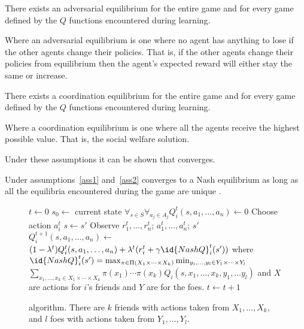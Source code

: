 \begin{assumption}
  \label{ass1}
  There exists an adversarial equilibrium for the entire game and
  for every game defined by the $Q$ functions encountered during
  learning.
\end{assumption}
Where an adversarial equilibrium is one where no agent has anything to
lose if the other agents change their policies. That is, if the other
agents change their policies from equilibrium then the agent's
expected reward will either stay the same or increase.
\begin{assumption}
  \label{ass2}
  There exists a coordination equilibrium for the entire game and for
  every game defined by the $Q$ functions encountered during learning.
\end{assumption}
Where a coordination equilibrium is one where all the agents receive
the highest possible value. That is, the social welfare solution.

Under these assumptions it can be shown that 
converges.

\begin{theorem}
  Under assumptions~\ref{ass1} and~\ref{ass2} 
  converges to a Nash equilibrium as long as all the equilibria
  encountered during the game are unique \cite{hu03a}.
\end{theorem}

\begin{SCfigure}
  \begin{minipage}{1.0\linewidth}
  \begin{codebox}
    \li $t \gets 0$
    \li $s_0 \gets$ current state
    \li $\forall_{s \in S} \forall_{a_j \in A_j} Q_i^t(s,a_1,\ldots,a_n) \gets 0$
    \li Choose action $a_i^t$
    \li $s \gets s'$
    \li Observe $r_1^t,\ldots,r_n^t;\, a_1^t,\ldots,a_n^t;\, s'$
    \li $Q_i^{t+1} (s, a_1,\ldots,a_n) \gets$
    \zi \>$(1 - \lambda^t) Q_i^{t} (s, a_1,\ldots,a_n) + \lambda^t(r_i^t + \gamma \id{NashQ}_i^t(s'))$
    \zi \> where $\id{NashQ}_i^t(s') = \max_{\pi \in \Pi(X_1 \times\cdots\times X_k)} \min_{y_i,\ldots,y_l \in Y_1\times\cdots\times Y_l}$
    \zi \>\> $\sum_{x_1,\ldots ,x_k \in X_1\times\cdots\times X_k} \pi(x_1)\cdots\pi(x_k) Q_i(s,x_1,\ldots, x_k,y_1,\ldots y_l)$
    \zi \> and $X$ are actions for $i$'s friends and $Y$ are for the foes.
    \End
    \li $t \gets t + 1$
    \li {}
  \end{codebox}
  \end{minipage}
  \caption{ algorithm. There are $k$ friends
    with actions taken from $X_1,\ldots,X_k$, and $l$ foes with
    actions taken from $Y_1,\ldots,Y_l$. }
  \label{fig:fof}
\end{SCfigure}

